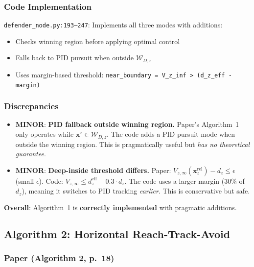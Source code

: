 \documentclass[11pt,a4paper]{article}
\begin{document}
\subsubsection{Code Implementation}

\texttt{defender\_node.py:193--247}: Implements all three modes with additions:
\begin{itemize}[nosep]
\item Checks winning region before applying optimal control
\item Falls back to PID pursuit when outside $\mathcal{W}_{D,z}$
\item Uses margin-based threshold: \texttt{near\_boundary = V\_z\_inf > (d\_z\_eff - margin)}
\end{itemize}

\subsubsection{Discrepancies}

\begin{itemize}
\item \textcolor{minblue}{\textbf{MINOR}}: \textbf{PID fallback outside winning region.} Paper's Algorithm~1 only operates while $\mathbf{x}^z \in \mathcal{W}_{D,z}$. The code adds a PID pursuit mode when outside the winning region. This is pragmatically useful but \emph{has no theoretical guarantee}.

\item \textcolor{minblue}{\textbf{MINOR}}: \textbf{Deep-inside threshold differs.} Paper: $V_{z,\infty}(\mathbf{x}^{\mathrm{rel}}_z) - d_z \leq \epsilon$ (small $\epsilon$). Code: $V_{z,\infty} \leq d_z^{\mathrm{eff}} - 0.3 \cdot d_z$. The code uses a larger margin (30\% of $d_z$), meaning it switches to PID tracking \emph{earlier}. This is conservative but safe.
\end{itemize}

\noindent\textbf{Overall}: Algorithm~1 is \textbf{correctly implemented} with pragmatic additions.

\subsection{Algorithm 2: Horizontal Reach-Track-Avoid}

\subsubsection{Paper (Algorithm 2, p.~18)}
\end{document}

